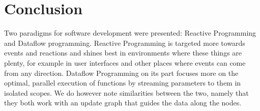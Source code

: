 \section{Conclusion}

Two paradigms for software development were presented: Reactive Programming and Dataflow programming. 
Reactive Programming is targeted more towards events and reactions and shines best in environments where these things are plenty, for example in user interfaces and other places where events can come from any direction. Dataflow Programming on its part focuses more on the optimal, parallel execution of functions by streaming parameters to them in isolated scopes. We do however note similarities between the two, namely that they both work with an update graph that guides the data along the nodes. 



